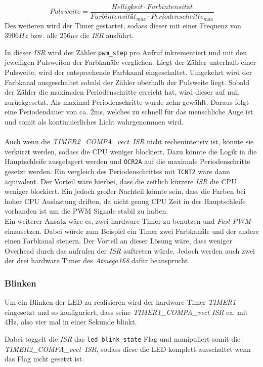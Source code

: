     \begin{displaymath}
        Pulsweite = \frac{Helligkeit \cdot Farbintensität}{Farbintensität_{max} \cdot Periodenschritte_{max}}
    \end{displaymath}
    Des weiteren wird der Timer gestartet, sodass dieser mit einer Frequenz von
    $3906Hz$ bzw. alle $256\mu{s}$ die \textit{ISR} ausführt.
    \newpage
    
    In dieser \textit{ISR} wird der Zähler \texttt{pwm\_step} pro Aufruf inkrementiert und 
    mit den jeweiligen Pulsweiten der Farbkanäle verglichen.
    Liegt der Zähler unterhalb einer Pulsweite, wird der entsprechende Farbkanal
    eingeschaltet. Umgekehrt wird der Farbkanal ausgeschaltet sobald der Zähler
    oberhalb der Pulsweite liegt. Sobald der Zähler die maximalen Periodenschritte
    erreicht hat, wird dieser auf null zurückgesetzt.
    Als maximal Periodenschritte wurde zehn gewählt. Daraus folgt eine Periodendauer
    von ca. 2ms, welches zu schnell für das menschliche Auge ist und somit 
    als kontinuierliches Licht wahrgenommen wird.
    \\\\
    Auch wenn die \textit{TIMER2\_COMPA\_vect\ ISR} nicht rechenintensiv ist, könnte sie verkürzt
    werden, sodass die CPU weniger blockiert. Dazu könnte die Logik in die
    Hauptschleife ausgelagert werden und \texttt{OCR2A} auf die maximale
    Periodenschritte gesetzt werden. Ein vergleich des Periodenschrittes mit
    \texttt{TCNT2} wäre dann äquivalent. Der Vorteil wäre hierbei, dass die
    zeitlich kürzere \textit{ISR} die CPU weniger blockiert.
    Ein jedoch großer Nachteil könnte sein,
    dass die Farben bei hoher CPU Auslastung driften, da nicht genug CPU Zeit
    in der Hauptschleife vorhanden ist um die PWM Signale stabil zu halten.
    \\
    Ein weiterer Ansatz wäre es, zwei hardware Timer zu benutzen und
    \textit{Fast-PWM} einzusetzen. Dabei würde zum Beispiel ein Timer zwei
    Farbkanäle und der andere einen Farbkanal steuern.
    Der Vorteil an dieser Lösung wäre, dass weniger Overhead durch das aufrufen
    der \textit{ISR} auftreten würde. Jedoch werden auch zwei der drei hardware
    Timer des \textit{Atmega168} dafür beansprucht.

\subsubsection{Blinken}
    Um ein Blinken der LED zu realisieren wird der hardware Timer \textit{TIMER1}
    eingesetzt und so konfiguriert, dass seine \textit{TIMER1\_COMPA\_vect ISR}
    ca. mit 4Hz, also vier mal in einer Sekunde blinkt.
    
    Dabei toggelt die \textit{ISR} das \texttt{led\_blink\_state} Flag und
    manipuliert somit die \\\textit{TIMER2\_COMPA\_vect\ ISR},
    sodass diese die LED komplett ausschaltet wenn das Flag nicht gesetzt ist.
    
    

